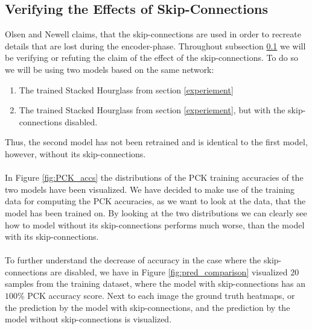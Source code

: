 \documentclass[./main.tex]{subfiles}
\begin{document}
\subsection{Verifying the Effects of Skip-Connections}\label{subsec:verifying_skip_cons}
Olsen \cite{Camilla} and Newell \cite{Newell} claims, that the skip-connections are used in order to recreate details that are lost during the encoder-phase. Throughout subsection \ref{subsec:verifying_skip_cons} we will be verifying or refuting the claim of the effect of the skip-connections. To do so we will be using two models based on the same network:
\begin{enumerate}
    \item The trained Stacked Hourglass from section \ref{experiement}
    \item The trained Stacked Hourglass from section \ref{experiement}, but with the skip-connections disabled.
\end{enumerate}
Thus, the second model has not been retrained and is identical to the first model, however, without its skip-connections.
\\
\\
In Figure \ref{fig:PCK_accs} the distributions of the PCK training accuracies of the two models have been visualized. We have decided to make use of the training data for computing the PCK accuracies, as we want to look at the data, that the model has been trained on. By looking at the two distributions we can clearly see how to model without its skip-connections performs much worse, than the model with its skip-connections.
\\
\\
To further understand the decrease of accuracy in the case where the skip-connections are disabled, we have in Figure \ref{fig:pred_comparison} visualized $20$ samples from the training dataset, where the model with skip-connections has an $100\%$ PCK accuracy score. Next to each image the ground truth heatmaps, or the prediction by the model with skip-connections, and the prediction by the model without skip-connections is visualized.
\\
\end{document}
